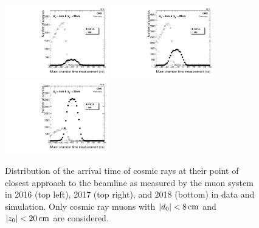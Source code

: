 \begin{figure}
\centering
\includegraphics[width=0.4\textwidth]{figures/tracking_eff/2016/Muon2TimeAve.pdf}
\includegraphics[width=0.4\textwidth]{figures/tracking_eff/2017/Muon2TimeAve.pdf}
\includegraphics[width=0.4\textwidth]{figures/tracking_eff/2018/Muon2TimeAve.pdf}
\caption{Distribution of the arrival time of cosmic rays at their point of closest approach to the beamline as measured by the muon system in 2016 (top left), 2017 (top right), and 2018 (bottom) in data and simulation. Only cosmic ray muons with $\ad<\SI{8}{\cm}$ and $\az<\SI{20}{\cm}$ are considered.}
\label{arrival_time}
\end{figure}

